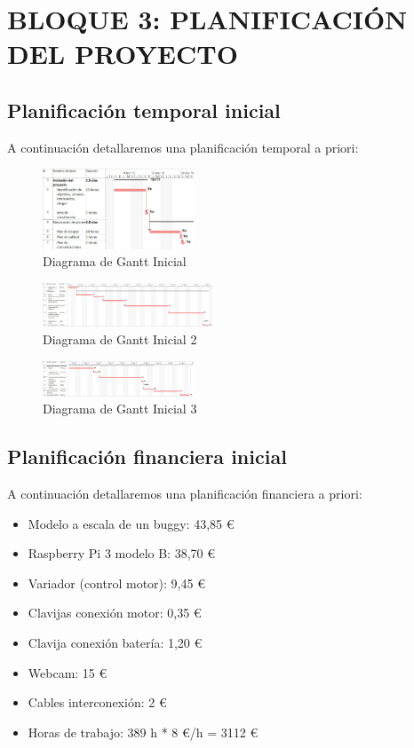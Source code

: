 \documentclass{pclass}
\begin{document}
\chapter{BLOQUE 3: PLANIFICACIÓN DEL PROYECTO}
\section{Planificación temporal inicial} 
A continuación detallaremos una planificación temporal a priori:

\begin{figure}[H]
  \centering
    \includegraphics[angle=270,width=0.40\textwidth]{img/ganttInicial}
  \caption{Diagrama de Gantt Inicial}
  \label{fig:ganttInicial}
\end{figure}

\begin{figure}[H]
	\centering
	\includegraphics[angle=270,width=0.45\textwidth]{img/ganttInicial_2}
	\caption{Diagrama de Gantt Inicial 2}
	\label{fig:ganttInicial2}
\end{figure}

\begin{figure}[H]
	\centering
	\includegraphics[angle=270,width=0.40\textwidth]{img/ganttInicial_3}
	\caption{Diagrama de Gantt Inicial 3}
	\label{fig:ganttInicial3}
\end{figure}



\section{Planificación financiera inicial} 
A continuación detallaremos una planificación financiera a priori:
\begin{itemize}
    \item Modelo a escala de un buggy: 43,85 \euro
    \item Raspberry Pi 3 modelo B: 38,70 \euro
    \item Variador (control motor): 9,45 \euro
    \item Clavijas conexión motor: 0,35 \euro
    \item Clavija conexión batería: 1,20 \euro
    \item Webcam: 15 \euro
    \item Cables interconexión: 2 \euro
    \item Horas de trabajo: 389 h * 8 \euro/h = 3112 \euro

\end{itemize}
\end{document}
